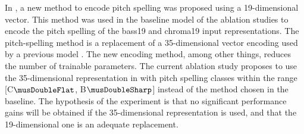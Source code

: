 
In , a new method to encode
pitch spelling was proposed using a 19-dimensional vector.
This method was used in the baseline model of the ablation
studies to encode the pitch spelling of the \gls{bass19} and
\gls{chroma19} input representations. The pitch-spelling
method is a replacement of a 35-dimensional vector encoding
used by a previous model \parencite{micchi2021deep}. The new
encoding method, among other things, reduces the number of
trainable parameters. The current ablation study proposes to
use the 35-dimensional representation in
\textcite{micchi2021deep} with pitch spelling classes within
the range [C$\musDoubleFlat$, B$\musDoubleSharp$] instead of
the method chosen in the baseline. The hypothesis of the
experiment is that no significant performance gains will be
obtained if the 35-dimensional representation is used, and
that the 19-dimensional one is an adequate replacement.

